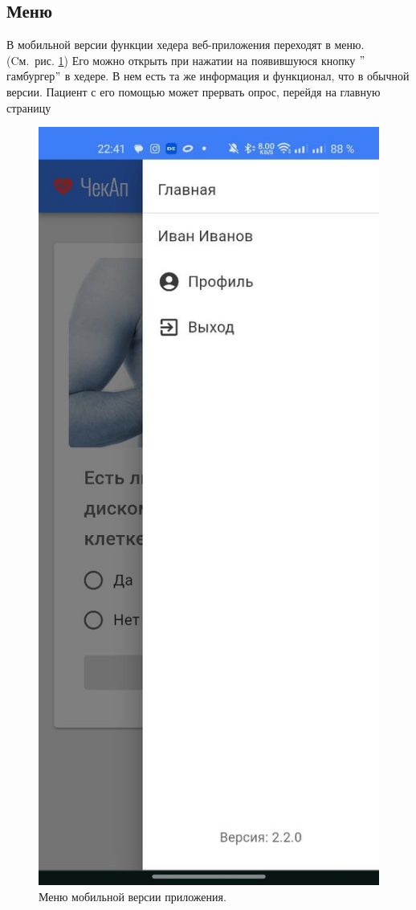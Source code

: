 \subsection{Меню}\label{subsec:-214}
В мобильной версии функции хедера веб-приложения переходят в меню.
(Cм.\ рис. \ref{fig:figure58})
Его можно открыть при нажатии на появившуюся кнопку \("\)гамбургер\("\) в хедере.
В нем есть та же информация и функционал, что в обычной версии.
Пациент с его помощью может прервать опрос, перейдя на главную страницу

\begin{figure}[htbp]
    \centering
    \includegraphics[height=\dimexpr\textheight/3\relax]{images/screenshots/menu_mobile}
    \caption{Меню мобильной версии приложения.}
    \label{fig:figure58}
\end{figure}






